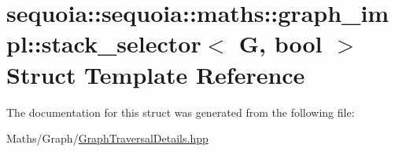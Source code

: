 \hypertarget{structsequoia_1_1sequoia_1_1maths_1_1graph__impl_1_1stack__selector}{}\section{sequoia\+::sequoia\+::maths\+::graph\+\_\+impl\+::stack\+\_\+selector$<$ G, bool $>$ Struct Template Reference}
\label{structsequoia_1_1sequoia_1_1maths_1_1graph__impl_1_1stack__selector}


The documentation for this struct was generated from the following file\+:\begin{DoxyCompactItemize}
\item 
Maths/\+Graph/\mbox{\hyperlink{_graph_traversal_details_8hpp}{Graph\+Traversal\+Details.\+hpp}}\end{DoxyCompactItemize}

